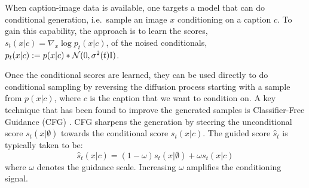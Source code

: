 \documentclass[format=acmsmall, review=false]{acmart}
\begin{document}
When caption-image data is available, one targets a model that can do conditional generation, i.e.~sample an image $x$  conditioning on a caption $c$. To gain this capability, the approach is to learn the scores, $s_t(x|c) = \nabla_{x} \log p_t(x|c)$,  of the noised conditionals, $p_t(x|c):=p(x|c)\ast {\mathcal N}(0,\sigma^2(t){\rm I})$.

 Once the conditional scores are learned, they can be used directly to do conditional sampling by reversing the diffusion process starting with a sample from $p(x|c)$, where $c$ is the caption that we want to condition on. A key technique that has been found to improve the generated samples is Classifier-Free Guidance (CFG) \citep{ho2022cfg}. CFG sharpens the generation by steering the unconditional score $s_t(x|\emptyset)$ towards the conditional score $s_t(x|c)$.  The guided score $\hat{s}_t$ is typically taken to be:
\begin{equation}
    \hat{s}_t(x|c) = (1-\omega) s_t(x|\emptyset) + \omega s_t(x|c) \label{eq:CFG}
\end{equation}
where $\omega$ denotes the guidance scale. Increasing $\omega$ amplifies the conditioning signal.
\end{document}

